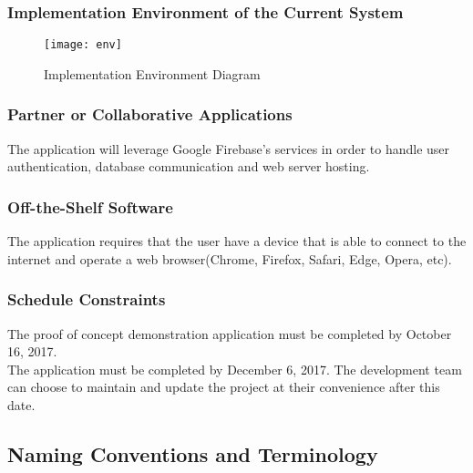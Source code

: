 \documentclass[12pt,fleqn]{article}
\begin{document}
\subsubsection {Implementation Environment of the Current System}
\begin{figure}[htp]
\centering
\texttt{[image: env]}
\caption{Implementation Environment Diagram}
\label{fig:env}
\end{figure}

\subsubsection {Partner or Collaborative Applications}
The application will leverage Google Firebase's services in order to handle user authentication, database communication and web server hosting.

\subsubsection {Off-the-Shelf Software}
The application requires that the user have a device that is able to connect to the internet and operate a web browser(Chrome, Firefox, Safari, Edge, Opera, etc). 

\subsubsection {Schedule Constraints}
The proof of concept demonstration application must be completed by October 16, 2017. \\
The application must be completed by December 6, 2017.  The development team can choose to maintain and update the project at their convenience after this date.


\subsection {Naming Conventions and Terminology}
\end{document}

